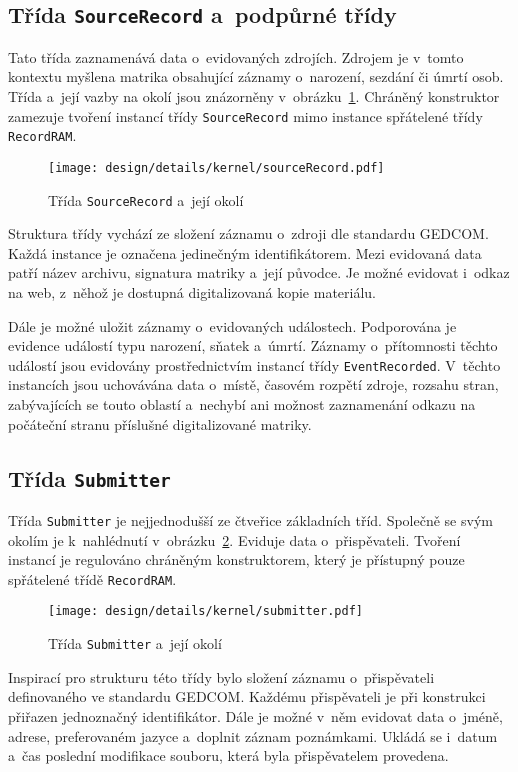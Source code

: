 		\subsection*{Třída \texttt{SourceRecord} a~podpůrné třídy} %
		Tato třída zaznamenává data o~evidovaných zdrojích. Zdrojem je v~tomto kontextu myšlena matrika obsahující záznamy o~narození, sezdání či úmrtí osob. Třída a~její vazby na okolí jsou znázorněny v~obrázku~\ref{fig:designDetailSourceRecord}. Chráněný konstruktor zamezuje tvoření instancí třídy \texttt{SourceRecord} mimo instance spřátelené třídy \texttt{RecordRAM}.\par
		\begin{figure}[h]
			\centering
			\texttt{[image: design/details/kernel/sourceRecord.pdf]}
			\caption{Třída \texttt{SourceRecord} a~její okolí}
			\label{fig:designDetailSourceRecord}
		\end{figure}
		Struktura třídy vychází ze složení záznamu o~zdroji dle standardu GEDCOM. Každá instance je označena jedinečným identifikátorem. Mezi evidovaná data patří název archivu, signatura matriky a~její původce. Je možné evidovat i~odkaz na web, z~něhož je dostupná digitalizovaná kopie materiálu.\par
		Dále je možné uložit záznamy o~evidovaných událostech. Podporována je evidence událostí typu narození, sňatek a~úmrtí. Záznamy o~přítomnosti těchto událostí jsou evidovány prostřednictvím instancí třídy \texttt{EventRecorded}. V~těchto instancích jsou uchovávána data o~místě, časovém rozpětí zdroje, rozsahu stran, zabývajících se touto oblastí a~nechybí ani možnost zaznamenání odkazu na počáteční stranu příslušné digitalizované matriky.\par
		
		\subsection*{Třída \texttt{Submitter}}
		Třída \texttt{Submitter} je nejjednodušší ze čtveřice základních tříd. Společně se svým okolím je k~nahlédnutí v~obrázku~\ref{fig:designDetailSubmitter}. Eviduje data o~přispěvateli. Tvoření instancí je regulováno chráněným konstruktorem, který je přístupný pouze spřátelené třídě \texttt{RecordRAM}.\par
		\begin{figure}[h]
			\centering
			\texttt{[image: design/details/kernel/submitter.pdf]}
			\caption{Třída \texttt{Submitter} a~její okolí}
			\label{fig:designDetailSubmitter}
		\end{figure}
		Inspirací pro strukturu této třídy bylo složení záznamu o~přispěvateli definovaného ve standardu GEDCOM. Každému přispěvateli je při konstrukci přiřazen jednoznačný identifikátor. Dále je možné v~něm evidovat data o~jméně, adrese, preferovaném jazyce a~doplnit záznam poznámkami. Ukládá se i~datum a~čas poslední modifikace souboru, která byla přispěvatelem provedena.\par
		
